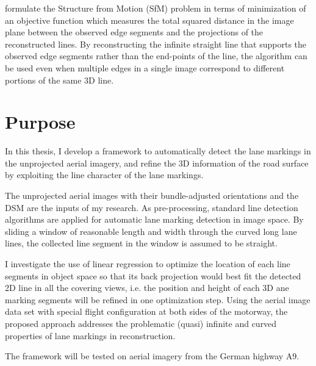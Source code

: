 \citeauthor{TaylorNov1995} formulate the Structure from Motion (SfM) problem in terms of minimization of an objective function which measures the total squared distance in the image plane between the observed edge segments and the projections of the reconstructed lines. By reconstructing the infinite straight line that supports the observed edge segments rather than the end-points of the line, the algorithm can be used even when multiple edges in a single image correspond to different portions of the same 3D line.

\section{Purpose}

In this thesis, I develop a framework to automatically detect the lane markings in the unprojected aerial imagery, and refine the 3D information of the road surface by exploiting the line character of the lane markings.

The unprojected aerial images with their bundle-adjusted orientations and the DSM are the inputs of my research. As pre-processing, standard line detection algorithms are applied for automatic lane marking detection in image space. By sliding a window of reasonable length and width through the curved long lane lines, the collected line segment in the window is assumed to be straight.

I investigate the use of linear regression to optimize the location of each line segments in object space so that its back projection would best fit the detected 2D line in all the covering views, i.e. the position and height of each 3D ane marking segments will be refined in one optimization step. Using the aerial image data set with special flight configuration at both sides of the motorway, the proposed approach addresses the problematic (quasi) infinite and curved properties of lane markings in reconstruction.

The framework will be tested on aerial imagery from the German highway A9.%
